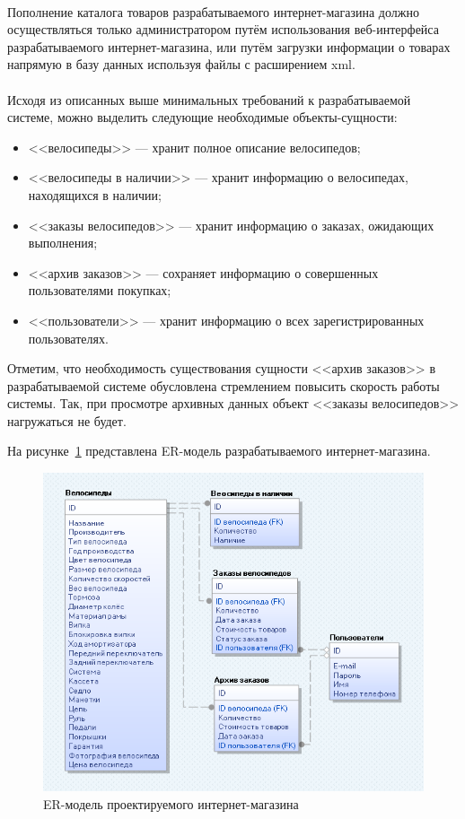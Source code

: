 \paragraph{}
Пополнение каталога товаров разрабатываемого интернет-магазина должно осуществляться
только администратором путём использования веб-интерфейса разрабатываемого
интернет-магазина, или путём загрузки информации
о товарах напрямую в базу данных используя файлы с расширением xml.

\paragraph{}
Исходя из описанных выше минимальных требований к разрабатываемой
системе, можно выделить следующие необходимые объекты-сущности:
\begin{itemize}
  \item <<велосипеды>> --- хранит полное описание велосипедов;
  \item <<велосипеды в наличии>> --- хранит информацию о велосипедах, находящихся в наличии;
  \item <<заказы велосипедов>> --- хранит информацию о заказах, ожидающих выполнения;
  \item <<архив заказов>> --- сохраняет информацию о совершенных пользователями
    покупках;
  \item <<пользователи>> --- хранит информацию о всех зарегистрированных пользователях.
\end{itemize}

Отметим, что необходимость существования сущности <<архив заказов>> в разрабатываемой
системе обусловлена стремлением повысить скорость работы системы. Так, при просмотре
архивных данных объект <<заказы велосипедов>> нагружаться не будет.

\pagebreak

На рисунке~\ref{fig:ER_model} представлена ER-модель
разрабатываемого интернет-магазина.

\begin{figure}[h]
  \centering
  \includegraphics[width=150mm]{pic/ER.png}
  \caption{ER-модель проектируемого интернет-магазина}
  \label{fig:ER_model}
\end{figure}

